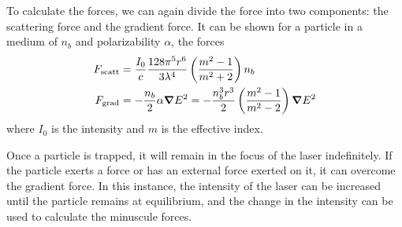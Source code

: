 \documentclass{article}
\begin{document}
	To calculate the forces, we can again divide the force into two components: the scattering force and the gradient force. It can be shown\cite{Ashkin:86} for a particle in a medium of $n_b$ and polarizability $\alpha$, the forces \begin{align*}
		F_\mathrm{scatt} & = \frac{I_0}{c} \frac{128 \pi^5 r^6}{3 \lambda^4} \left(\frac{m^2 - 1}{m^2+2}\right) n_b \\
		F_\mathrm{grad} & = -\frac{n_b}{2} \alpha \grad{E^2} = -\frac{n_b^3 r^3}{2} \left(\frac{m^2 - 1}{m^2 -2}\right) \grad{E^2}
	\end{align*}
	where $I_0$ is the intensity and $m$ is the effective index. 
	
	Once a particle is trapped, it will remain in the focus of the laser indefinitely. If the particle exerts a force or has an external force exerted on it, it can overcome the gradient force. In this instance, the intensity of the laser can be increased until the particle remains at equilibrium, and the change in the intensity can be used to calculate the minuscule forces.

	
	
	
	\pagebreak
	
	{}
	
	
\end{document}
